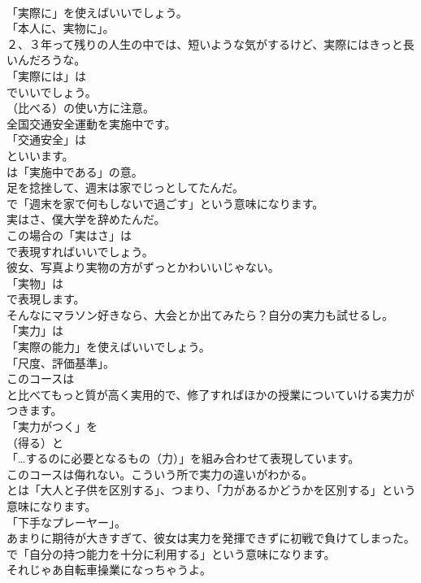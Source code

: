 \documentclass[8pt]{extreport}
\begin{document}
\begin{CJK}{UTF8}{min}
\\	「実際に」を使えばいいでしょう。
\\	「本人に、実物に」。	
\\	２、３年って残りの人生の中では、短いような気がするけど、実際にはきっと長いんだろうな。 
\\	「実際には」は
\\	でいいでしょう。
\\	（比べる）の使い方に注意。	
\\	全国交通安全運動を実施中です。 
\\	「交通安全」は
\\	といいます。
\\	は「実施中である」の意。	
\\	足を捻挫して、週末は家でじっとしてたんだ。 
\\	で「週末を家で何もしないで過ごす」という意味になります。	
\\	実はさ、僕大学を辞めたんだ。 
\\	この場合の「実はさ」は 
\\	で表現すればいいでしょう。	
\\	彼女、写真より実物の方がずっとかわいいじゃない。 
\\	「実物」は
\\	で表現します。	
\\	そんなにマラソン好きなら、大会とか出てみたら？自分の実力も試せるし。 
\\	「実力」は
\\	「実際の能力」を使えばいいでしょう。
\\	「尺度、評価基準」。	
\\	このコースは
\\	と比べてもっと質が高く実用的で、修了すればほかの授業についていける実力がつきます。 
\\	「実力がつく」を 
\\	（得る）と
\\	「…するのに必要となるもの（力）」を組み合わせて表現しています。	
\\	このコースは侮れない。こういう所で実力の違いがわかる。 
\\	とは「大人と子供を区別する」、つまり、「力があるかどうかを区別する」という意味になります。
\\	「下手なプレーヤー」。	
\\	あまりに期待が大きすぎて、彼女は実力を発揮できずに初戦で負けてしまった。 
\\	で「自分の持つ能力を十分に利用する」という意味になります。	
\\	それじゃあ自転車操業になっちゃうよ。 

\end{CJK}
\end{document}
